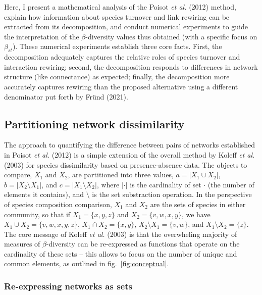 \documentclass[11pt]{article}
\begin{document}
Here, I present a mathematical analysis of the Poisot \emph{et al.}
(2012) method, explain how information about species turnover and link
rewiring can be extracted from its decomposition, and conduct numerical
experiments to guide the interpretation of the \(\beta\)-diversity
values thus obtained (with a specific focus on \(\beta_{st}\)). These
numerical experiments establish three core facts. First, the
decomposition adequately captures the relative roles of species turnover
and interaction rewiring; second, the decomposition responds to
differences in network structure (like connectance) as expected;
finally, the decomposition more accurately captures rewiring than the
proposed alternative using a different denominator put forth by Fründ
(2021).

\hypertarget{partitioning-network-dissimilarity}{%
\subsection{Partitioning network
dissimilarity}\label{partitioning-network-dissimilarity}}

The approach to quantifying the difference between pairs of networks
established in Poisot \emph{et al.} (2012) is a simple extension of the
overall method by Koleff \emph{et al.} (2003) for species dissimilarity
based on presence-absence data. The objects to compare, \(X_1\) and
\(X_2\), are partitioned into three values, \(a = |X_1 \cup X_2|\),
\(b = |X_2 \setminus X_1|\), and \(c = |X_1 \setminus X_2|\), where
\(|\cdot|\) is the cardinality of set \(\cdot\) (the number of elements
it contains), and \(\setminus\) is the set substraction operation. In
the perspective of species composition comparison, \(X_1\) and \(X_2\)
are the sets of species in either community, so that if
\(X_1 = \{x, y, z\}\) and \(X_2 = \{v, w, x, y\}\), we have
\(X_1 \cup X_2 = \{v, w, x, y, z\}\), \(X_1 \cap X_2 = \{x, y\}\),
\(X_2 \setminus X_1 = \{v, w\}\), and \(X_1 \setminus X_2 = \{z\}\). The
core message of Koleff \emph{et al.} (2003) is that the overwheling
majority of measures of \(\beta\)-diversity can be re-expressed as
functions that operate on the cardinality of these sets -- this allows
to focus on the number of unique and common elements, as outlined in
fig.~\ref{fig:conceptual}.

\hypertarget{re-expressing-networks-as-sets}{%
\subsubsection{Re-expressing networks as
sets}\label{re-expressing-networks-as-sets}}
\end{document}
